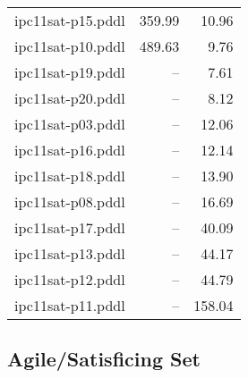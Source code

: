 \documentclass{article}
\begin{document}
\begin{center}
\begin{tabular}{@{}l|r|r@{}}
 ipc11sat-p15.pddl&359.99&10.96\\
 ipc11sat-p10.pddl&489.63&9.76\\
 ipc11sat-p19.pddl&--&7.61\\
 ipc11sat-p20.pddl&--&8.12\\
 ipc11sat-p03.pddl&--&12.06\\
 ipc11sat-p16.pddl&--&12.14\\
 ipc11sat-p18.pddl&--&13.90\\
 ipc11sat-p08.pddl&--&16.69\\
 ipc11sat-p17.pddl&--&40.09\\
 ipc11sat-p13.pddl&--&44.17\\
 ipc11sat-p12.pddl&--&44.79\\
 ipc11sat-p11.pddl&--&158.04
                            \end{tabular}
                            \end{center}
                    

                    \subsection*{Agile/Satisficing Set}
                    
\end{document}
